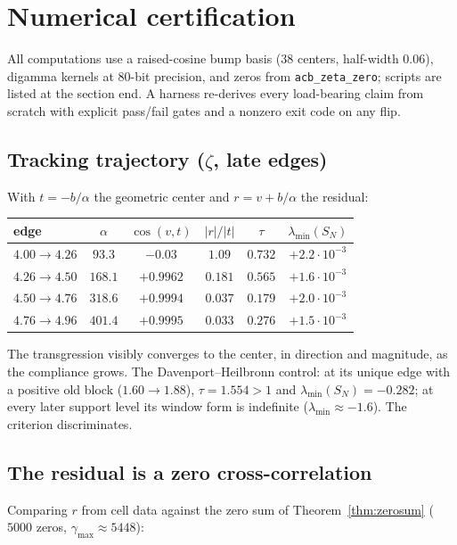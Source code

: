\documentclass[11pt,reqno]{amsart}
\theoremstyle{plain}
\theoremstyle{definition}
\theoremstyle{remark}
\newcommand{\eigmin}{\lambda_{\min}}
\begin{document}
\section{Numerical certification}\label{sec:numerics}

All computations use a raised-cosine bump basis ($38$ centers, half-width $0.06$), digamma
kernels at $80$-bit precision, and zeros from \texttt{acb\_zeta\_zero}; scripts are listed at
the section end. A harness re-derives every load-bearing claim from scratch with explicit
pass/fail gates and a nonzero exit code on any flip.

\subsection*{Tracking trajectory ($\zeta$, late edges)}
With $t = -b/\alpha$ the geometric center and $r = v + b/\alpha$ the residual:

\begin{center}
\begin{tabular}{lccccc}
\toprule
edge & $\alpha$ & $\cos(v, t)$ & $|r|/|t|$ & $\tau$ & $\eigmin(S_N)$ \\
\midrule
$4.00 \to 4.26$ & $93.3$ & $-0.03$ & $1.09$ & $0.732$ & $+2.2\cdot 10^{-3}$ \\
$4.26 \to 4.50$ & $168.1$ & $+0.9962$ & $0.181$ & $0.565$ & $+1.6\cdot 10^{-3}$ \\
$4.50 \to 4.76$ & $318.6$ & $+0.9994$ & $0.037$ & $0.179$ & $+2.0\cdot 10^{-3}$ \\
$4.76 \to 4.96$ & $401.4$ & $+0.9995$ & $0.033$ & $0.276$ & $+1.5\cdot 10^{-3}$ \\
\bottomrule
\end{tabular}
\end{center}

The transgression visibly converges to the center, in direction and magnitude, as the
compliance grows. The Davenport--Heilbronn control: at its unique edge with a positive old
block ($1.60 \to 1.88$), $\tau = 1.554 > 1$ and $\eigmin(S_N) = -0.282$; at every later
support level its window form is indefinite ($\eigmin \approx -1.6$). The criterion
discriminates.

\subsection*{The residual is a zero cross-correlation}
Comparing $r$ from cell data against the zero sum of Theorem~\ref{thm:zerosum}
($5000$ zeros, $\gamma_{\max} \approx 5448$):
\end{document}
